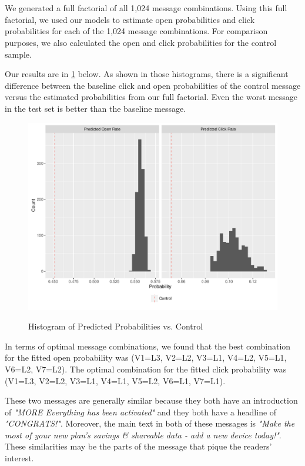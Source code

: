 \section{} %
We generated a full factorial of all 1,024 message combinations. Using this full factorial, we used our models to estimate open probabilities and click probabilities for each of the 1,024 message combinations. For comparison purposes, we also calculated the open and click probabilities for the control sample.

Our results are in \cref{fig:q3_hist} below. As shown in those histograms, there is a significant difference between the baseline click and open probabilities of the control message versus the estimated probabilities from our full factorial. Even the worst message in the test set is better than the baseline message.

\begin{figure}[!htb]
  \centering
  \caption{Histogram of Predicted Probabilities vs. Control}
  \includegraphics[scale=0.5]{q3_hist.pdf}
  \label{fig:q3_hist}
\end{figure}

In terms of optimal message combinations, we found that the best combination for the fitted open probability was (V1=L3, V2=L2, V3=L1, V4=L2, V5=L1, V6=L2, V7=L2). The optimal combination for the fitted click probability was (V1=L3, V2=L2, V3=L1, V4=L1, V5=L2, V6=L1, V7=L1).




These two messages are generally similar because they both have an introduction of \textit{"MORE Everything has been activated"} and they both have a headline of \textit{"CONGRATS!"}. Moreover, the main text in both of these messages is \textit{"Make the most of your new plan’s savings \& shareable data - add a new device today!"}. These similarities may be the parts of the message that pique the readers' interest.

